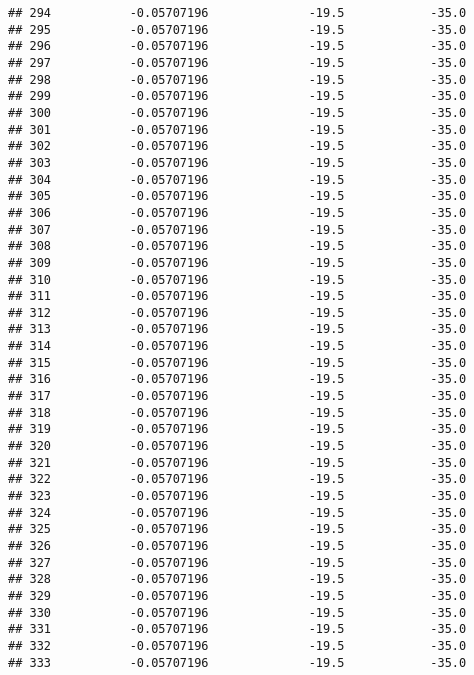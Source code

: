 \documentclass[]{article}
\begin{document}
\begin{verbatim}
## 294           -0.05707196              -19.5            -35.0
## 295           -0.05707196              -19.5            -35.0
## 296           -0.05707196              -19.5            -35.0
## 297           -0.05707196              -19.5            -35.0
## 298           -0.05707196              -19.5            -35.0
## 299           -0.05707196              -19.5            -35.0
## 300           -0.05707196              -19.5            -35.0
## 301           -0.05707196              -19.5            -35.0
## 302           -0.05707196              -19.5            -35.0
## 303           -0.05707196              -19.5            -35.0
## 304           -0.05707196              -19.5            -35.0
## 305           -0.05707196              -19.5            -35.0
## 306           -0.05707196              -19.5            -35.0
## 307           -0.05707196              -19.5            -35.0
## 308           -0.05707196              -19.5            -35.0
## 309           -0.05707196              -19.5            -35.0
## 310           -0.05707196              -19.5            -35.0
## 311           -0.05707196              -19.5            -35.0
## 312           -0.05707196              -19.5            -35.0
## 313           -0.05707196              -19.5            -35.0
## 314           -0.05707196              -19.5            -35.0
## 315           -0.05707196              -19.5            -35.0
## 316           -0.05707196              -19.5            -35.0
## 317           -0.05707196              -19.5            -35.0
## 318           -0.05707196              -19.5            -35.0
## 319           -0.05707196              -19.5            -35.0
## 320           -0.05707196              -19.5            -35.0
## 321           -0.05707196              -19.5            -35.0
## 322           -0.05707196              -19.5            -35.0
## 323           -0.05707196              -19.5            -35.0
## 324           -0.05707196              -19.5            -35.0
## 325           -0.05707196              -19.5            -35.0
## 326           -0.05707196              -19.5            -35.0
## 327           -0.05707196              -19.5            -35.0
## 328           -0.05707196              -19.5            -35.0
## 329           -0.05707196              -19.5            -35.0
## 330           -0.05707196              -19.5            -35.0
## 331           -0.05707196              -19.5            -35.0
## 332           -0.05707196              -19.5            -35.0
## 333           -0.05707196              -19.5            -35.0

\end{verbatim}
\end{document}
